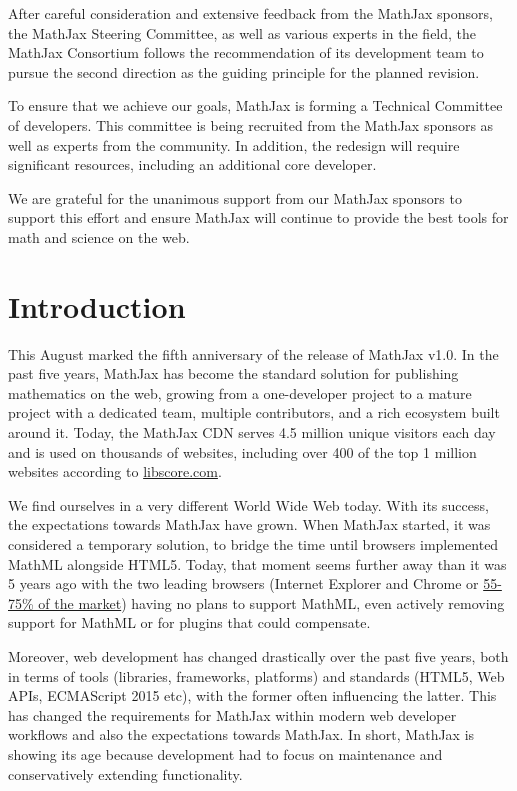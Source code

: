 \documentclass[]{amsart}
\begin{document}
After careful consideration and extensive feedback from the MathJax
sponsors, the MathJax Steering Committee, as well as various experts in
the field, the MathJax Consortium follows the recommendation of its
development team to pursue the second direction as the guiding principle
for the planned revision.

To ensure that we achieve our goals, MathJax is forming a Technical
Committee of developers. This committee is being recruited from the
MathJax sponsors as well as experts from the community. In addition, the
redesign will require significant resources, including an additional
core developer.

We are grateful for the unanimous support from our MathJax sponsors to
support this effort and ensure MathJax will continue to provide the best
tools for math and science on the web.

\section{Introduction}\label{introduction}

This August marked the fifth anniversary of the release of MathJax v1.0.
In the past five years, MathJax has become the standard solution for
publishing mathematics on the web, growing from a one-developer project
to a mature project with a dedicated team, multiple contributors, and a
rich ecosystem built around it. Today, the MathJax CDN serves 4.5
million unique visitors each day and is used on thousands of websites,
including over 400 of the top 1 million websites according to
\href{http://libscore.com/\#MathJax}{libscore.com}.

We find ourselves in a very different World Wide Web today. With its
success, the expectations towards MathJax have grown. When MathJax
started, it was considered a temporary solution, to bridge the time
until browsers implemented MathML alongside HTML5. Today, that moment
seems further away than it was 5 years ago with the two leading browsers
(Internet Explorer and Chrome or
\href{https://en.wikipedia.org/wiki/Usage_share_of_web_browsers\#Summary_tables}{55-75\%
of the market}) having no plans to support MathML, even actively
removing support for MathML or for plugins that could compensate.

Moreover, web development has changed drastically over the past five
years, both in terms of tools (libraries, frameworks, platforms) and
standards (HTML5, Web APIs, ECMAScript 2015 etc), with the former often
influencing the latter. This has changed the requirements for MathJax
within modern web developer workflows and also the expectations towards
MathJax. In short, MathJax is showing its age because development had to
focus on maintenance and conservatively extending functionality.
\end{document}
